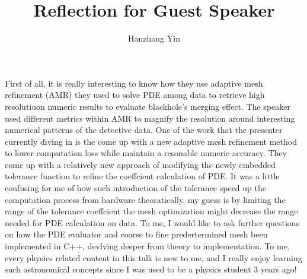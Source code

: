 \documentclass{article}
\title{Reflection for Guest Speaker}
\author{Hanzhang Yin}
\begin{document}
\maketitle

First of all, it is really interesting to know how they use adaptive mesh refinement (AMR) they used to solve PDE among data to retrieve high resolutiuon numeric results 
to evaluate blackhole's merging effect. The speaker used different metrics within AMR to magnify the resolution around interesting numerical patterns of the detective data. 
One of the work that the presenter currently diving in is the come up with a new adaptive mesh refinement method to lower computation loss while maintain a resonable numeric accuracy.
They come up with a relatively new approach of modifying the newly embedded tolerance function to refine the coeffcient calculation of PDE. 
It was a little confusing for me of how such introduction of the tolerance speed up the computation process from hardware theoratically, my guess is by limiting the range of the tolerance coeffcient
the mesh optimization might decrease the range needed for PDE calculation on data. To me, I would like to ask further questions on how the PDE evaluator and coarse to fine predertermined mesh been 
implemented in C++, devlving deeper from theory to implementation.
To me, every physics related content in this talk is new to me, and I really enjoy learning such astronomical concepts since I was used to be a physics student 3 years ago!
\end{document}
